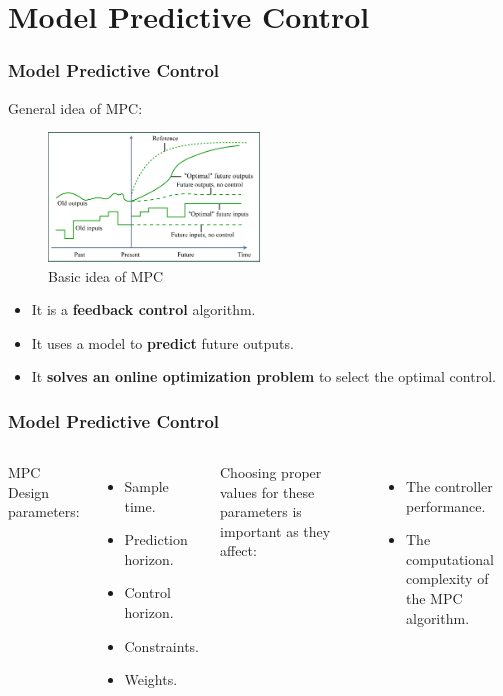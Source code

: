 \documentclass{thesisbeamer}
\newcommand\Fontvi{\fontsize{9}{10}\selectfont}
\begin{document}
\section{Model Predictive Control}

\begin{frame}
	\frametitle{Model Predictive Control}
	\Fontvi	

	General idea of MPC:
 	\begin{figure}[t]
 		\centering
 		\includegraphics[width=0.5\textwidth]{Images/Control/MPC_general_idea.png}
 		\caption{Basic idea of MPC\protect\footnotemark}
 		\label{MPC_basic_idea}
	\end{figure}  

	\begin{itemize} %
		\item It is a \textbf{feedback control} algorithm.
		\item It uses a model to \textbf{predict} future outputs.
		\item It \textbf{solves an online optimization problem} to select the optimal control.
	\end{itemize}


\end{frame}


\begin{frame}
\frametitle{Model Predictive Control}
\Fontvi	

\begin{columns}
MPC Design parameters:

\begin{itemize} %
	\item Sample time.
	\item Prediction horizon.
	\item Control horizon.
	\item Constraints.
	\item Weights.
\end{itemize}\pause


Choosing proper values for these parameters is important as they affect: 
\begin{itemize}
	\item The controller performance.
	\item The computational complexity of the MPC algorithm.
\end{itemize} 
\end{columns}

\end{frame}
\end{document}
